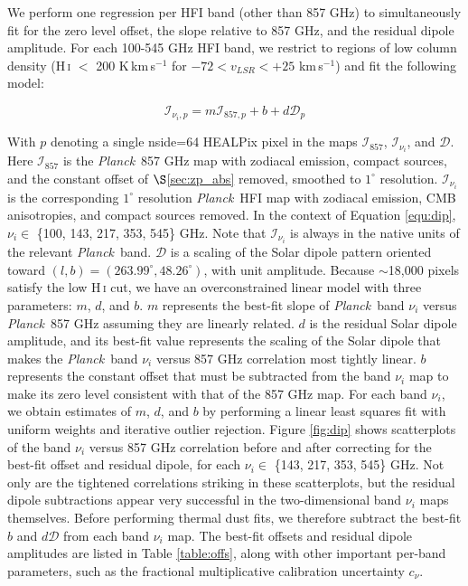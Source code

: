 \documentclass{emulateapj}
\newcommand{\PLANCK}{{\it Planck}}
\begin{document}
We perform one regression per HFI band (other than 857 GHz) to simultaneously 
fit for the zero level offset, the slope relative to 857 GHz, and the residual 
dipole amplitude. For each 100-545 GHz HFI band, we restrict to regions of low 
column density (H\,\textsc{i} $<$ 200 K\,km\,s$^{-1}$ for 
$-72$$<$$v_{LSR}$$<$$+25$ km\,s$^{-1}$) and fit the following model:

\begin{equation} \label{equ:dip}
\mathcal{I}_{\nu_i, p} = m\mathcal{I}_{857, p} + b + d\mathcal{D}_{p}
\end{equation}

With $p$ denoting a single nside=64 HEALPix pixel \citep{healpix} in the maps 
$\mathcal{I}_{857}$, $\mathcal{I}_{\nu_i}$, and $\mathcal{D}$. Here 
$\mathcal{I}_{857}$ is the \PLANCK~857 GHz map with zodiacal emission, compact 
sources, and the constant offset of $\S$\ref{sec:zp_abs} removed, smoothed to 
$1^{\circ}$ resolution. $\mathcal{I}_{\nu_i}$ is the corresponding $1^{\circ}$ 
resolution \PLANCK~HFI map with zodiacal emission, CMB anisotropies, and
compact sources removed. In the context of Equation \ref{equ:dip}, $\nu_i \in$ 
\{100, 143, 217, 353, 545\} GHz. Note that $\mathcal{I}_{\nu_i}$ is always in
the native units of the relevant \PLANCK~band. $\mathcal{D}$ is a scaling of 
the Solar dipole pattern oriented toward 
$(l, b) = (263.99^{\circ}, 48.26^{\circ})$, with unit amplitude. Because 
$\sim$18,000 pixels satisfy the low H\,\textsc{i} cut, we have an 
overconstrained linear model with three parameters: $m$, $d$, and $b$. $m$ 
represents the best-fit slope of \PLANCK~band $\nu_i$ versus \PLANCK~857 GHz 
assuming they are linearly related. $d$ is the residual Solar dipole amplitude,
and its best-fit value represents the scaling of the Solar dipole that makes 
the \PLANCK~band $\nu_i$ versus 857 GHz correlation most tightly linear. $b$ 
represents the constant offset that must be subtracted from the band $\nu_i$ 
map to make its zero level consistent with that of the 857 GHz map. For each 
band $\nu_i$, we obtain estimates of $m$, $d$, and $b$ by performing a linear 
least squares fit with uniform weights and iterative outlier rejection. Figure 
\ref{fig:dip} shows scatterplots of the band $\nu_i$ versus 857 GHz correlation
 before and after correcting for the best-fit offset and residual dipole, for 
each $\nu_i \in$ \{143, 217, 353, 545\} GHz. Not only are the tightened 
correlations striking in these scatterplots, but the residual dipole 
subtractions appear very successful in the two-dimensional band $\nu_i$ maps 
themselves. Before performing thermal dust fits, we therefore subtract the 
best-fit $b$ and $d\mathcal{D}$ from each band $\nu_i$ map. The best-fit 
offsets and residual dipole amplitudes are listed in Table \ref{table:offs},
along with other important per-band parameters, such as the fractional 
multiplicative calibration uncertainty $c_{\nu}$.
\end{document}
